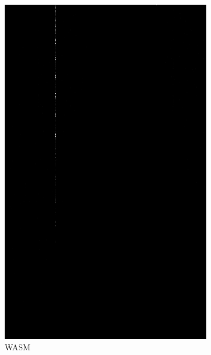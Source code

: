 \begin{figure}
\begin{subfigure}{0.29\textwidth}
        \includegraphics[width=\linewidth] {../../packages/js-benchmarks/img/diff_seq_wasm.png}
        \caption{WASM}\label{fig:diff:wasm}
    \end{subfigure}\hfill
    \begin{subfigure}{0.29\textwidth}

\end{subfigure}
\end{figure}
